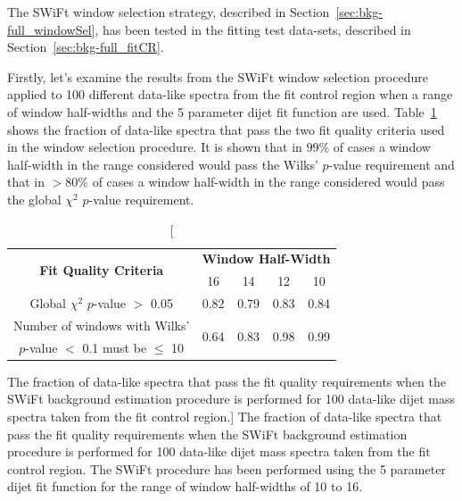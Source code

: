 The SWiFt window selection strategy, described in Section~\ref{sec:bkg-full_windowSel}, has been tested in the fitting test data-sets, described in Section~\ref{sec:bkg-full_fitCR}.


Firstly, let's examine the results from the SWiFt window selection procedure applied to 100 different data-like spectra from the fit control region
when a range of window half-widths and the 5 parameter dijet fit function are used.
Table~\ref{tab:windowSel_dataLike} shows the fraction of data-like spectra that pass the two fit quality criteria used in the window selection procedure.
It is shown that in $99\%$ of cases a window half-width in the range considered would pass the Wilks' \mbox{$p$-value} requirement
and that in $>80\%$ of cases a window half-width in the range considered would pass the global $\chi^{2}$ \mbox{$p$-value} requirement.

{\renewcommand{\arraystretch}{1.3}
\begin{table}[!htb]
\centering
\begin{tabular}{|c||c|c|c|c|}
\hline
 \multirow{2}{*}{\textbf{Fit Quality Criteria}} & \multicolumn{4}{c|}{\textbf{Window Half-Width}} \\ \cline{2-5} 
                                                & 16 & 14 & 12 & 10 \\ \hline
\multirow{2}{*}{Global $\chi^2$ $p$-value $>$ 0.05} & \multirow{2}{*}{0.82} & \multirow{2}{*}{0.79} & \multirow{2}{*}{0.83} & \multirow{2}{*}{0.84} \\
 &  &  &  &  \\ \hline
Number of windows with Wilks' & \multirow{2}{*}{0.64} & \multirow{2}{*}{0.83} & \multirow{2}{*}{0.98} & \multirow{2}{*}{0.99} \\
\mbox{$p$-value} $<$ 0.1 must be $\leq$ 10 &  &  &  &  \\ \hline
\end{tabular}
\caption
    [The fraction of data-like spectra that pass the fit quality requirements when the SWiFt background estimation procedure is performed for
      100 data-like dijet mass spectra taken from the \lm{} fit control region.]
    {The fraction of data-like spectra that pass the fit quality requirements when the SWiFt background estimation procedure is performed for
      100 data-like dijet mass spectra taken from the \lm{} fit control region.
      The SWiFt procedure has been performed using the 5 parameter dijet fit function
      for the range of window half-widths of 10 to 16.}
\label{tab:windowSel_dataLike}
\end{table}
\vspace{-1em}
}

